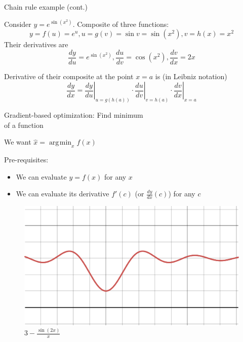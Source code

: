 \documentclass[12pt,aspectratio=169,handout]{beamer}
\DeclareMathOperator*{\argmin}{arg\!\min}
\begin{document}
\begin{frame}{Chain rule example (cont.)}
	
	Consider $y=e^{\sin(x^{2})}$. Composite of three functions:
	$$y = f(u) = e^u, u = g(v) = \sin v = \sin (x^2), v = h(x) = x^2$$
	Their derivatives are
	$$\frac{dy}{du} = e^{\sin(x^{2})}, \frac{du}{dv} = \cos (x^2), \frac{dv}{dx} = 2x$$
	
	\pause
	
	Derivative of their composite at the point $x = a$ is (in Leibniz notation)
	$$
	{\frac {dy}{dx}}=\left.{\frac {dy}{du}}\right|_{u=g(h(a))}\cdot \left.{\frac {du}{dv}}\right|_{v=h(a)}\cdot \left.{\frac {dv}{dx}}\right|_{x=a}
	$$
	
\end{frame}


\begin{frame}{Gradient-based optimization: Find minimum\\ of a function}
	
	We want $\hat{x} = \argmin_x f(x)$
	
	Pre-requisites:
	
	\begin{itemize}
		\item We can evaluate $y = f(x)$ for any $x$
		\item We can evaluate its derivative $f'(c)$ (or $\frac{dy}{dx}(c)$) for any $c$
	\end{itemize}
	
	\begin{figure}
		\includegraphics[width=0.4\linewidth]{img/desmos-graph1.pdf}	
		\caption{$3-\frac{\sin\left(2x\right)}{x}$}
	\end{figure}
	
\end{frame}
\end{document}
